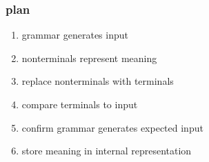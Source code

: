 \begin{frame}
    \frametitle{plan}
    \begin{enumerate}
        \item<+-> grammar generates input
        \item<+-> nonterminals represent meaning
        \item<+-> replace nonterminals with terminals
        \item<+-> compare terminals to input
        \item<+-> confirm grammar generates expected input
        \item<+-> store meaning in internal representation
    \end{enumerate}
\end{frame}
